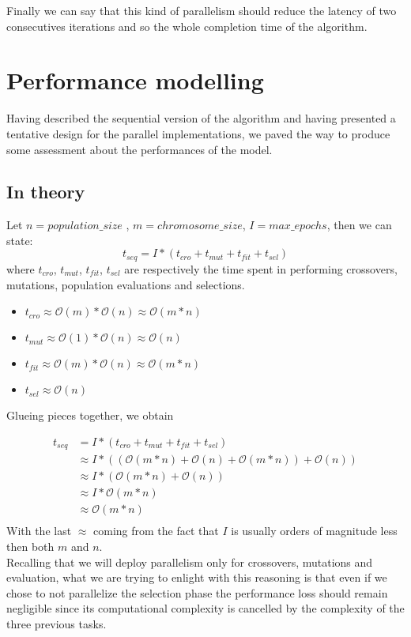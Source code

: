 \documentclass[11pt]{article}
\begin{document}
Finally we can say that this kind of parallelism should reduce the latency of two consecutives iterations and so the whole completion time of the algorithm.

\section{Performance modelling}
Having described the sequential version of the algorithm and having presented a tentative design for the parallel implementations, we paved the way to produce some assessment about the performances of the model.
\subsection{In theory}
Let $ n = population\_size$ , $m=chromosome\_size$, $ I = max\_epochs $, then we can state:
\[t_{seq} = I * (t_{cro} + t_{mut} + t_{fit} + t_{sel}) \]
where $ t_{cro}$, $ t_{mut}$, $t_{fit}$, $t_{sel}$ are respectively the time spent in performing crossovers, mutations, population evaluations and selections.
\begin{itemize}
	\item $ t_{cro} \approx \mathcal{O}(m) * \mathcal{O}(n) \approx \mathcal{O}(m*n) $
	\item $ t_{mut} \approx \mathcal{O}(1) * \mathcal{O}(n) \approx \mathcal{O}(n) $
	\item $ t_{fit} \approx \mathcal{O}(m) * \mathcal{O}(n) \approx \mathcal{O}(m*n) $
	\item $ t_{sel} \approx \mathcal{O}(n)$
\end{itemize}
Glueing pieces together, we obtain

\begin{align*}
t_{seq} &= I * (t_{cro} + t_{mut} + t_{fit} + t_{sel}) \\
& \approx I * ((\mathcal{O}(m*n) + \mathcal{O}(n) + \mathcal{O}(m*n)) + \mathcal{O}(n))\\
& \approx I * (\mathcal{O}(m*n) + \mathcal{O}(n)) \\
& \approx I * \mathcal{O}(m*n) \\
& \approx \mathcal{O}(m*n)\\
\end{align*}
With the last $ \approx $ coming from the fact that $ I $ is usually orders of magnitude less then both $ m $ and $ n $. \\

Recalling that we will deploy parallelism only for crossovers, mutations and evaluation,
what we are trying to enlight with this reasoning is that even if we chose to not parallelize the selection phase the performance loss should remain negligible since its computational complexity is cancelled by the complexity of the three previous tasks.
\end{document}
